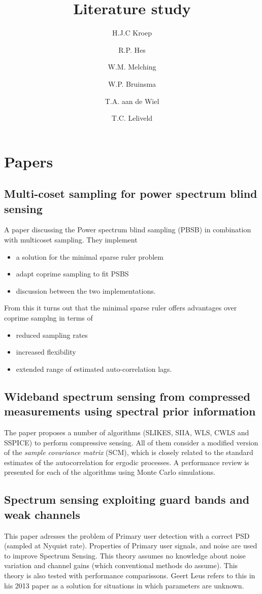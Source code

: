 \documentclass[report, oneside, a4paper, openany]{memoir}
\title{Literature study}
\author{H.J.C Kroep \and R.P. Hes \and W.M. Melching \and W.P. Bruinsma \and T.A. aan de Wiel \and T.C. Leliveld}
\begin{document}
\chapter{Papers}
\section{Multi-coset sampling for power spectrum blind sensing \cite{ariananda2011multicoset}}

A paper discussing the Power spectrum blind sampling (PBSB) in combination with multicoset sampling. They implement
\begin{itemize}
    \item a solution for the minimal sparse ruler problem
    \item adapt coprime sampling to fit PSBS
    \item discussion between the two implementations.
\end{itemize}
From this it turns out that the minimal sparse ruler offers advantages over coprime samplng in terms of
\begin{itemize}
    \item reduced sampling rates
    \item increased flexibility
    \item extended range of estimated auto-correlation lags.
\end{itemize}
\section{Wideband spectrum sensing from compressed measurements using spectral prior information \cite{romero2013wideband}}
The paper proposes a number of algorithms (SLIKES, SIIA, WLS, CWLS and SSPICE) to perform compressive sensing. All of them consider a modified version of the \emph{sample covariance matrix} (SCM), which is closely related to the standard estimates of the autocorrelation for ergodic processes. A performance review is presented for each of the algorithms using Monte Carlo simulations.
\section{Spectrum sensing exploiting guard bands and weak channels \cite{vazquez2011spectrum}}
This paper adresses the problem of Primary user detection with a correct PSD (sampled at Nyquist rate). Properties of Primary user signals, and noise are used to improve Spectrum Sensing. This theory assumes no knowledge about noise variation and channel gains (which conventional methods do assume). This theory is also tested with performance comparissons. Geert Leus refers to this in his 2013 paper as a solution for situations in which parameters are unknown. 
\end{document}
